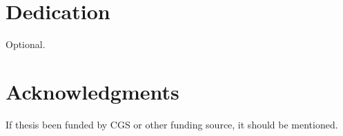 \chapter{Dedication}
Optional.


\chapter{Acknowledgments}

If thesis been funded by CGS or other funding source, it should be mentioned.


